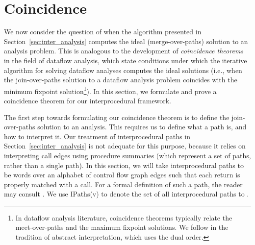    






































\section{Coincidence}

 We now consider the question of when the algorithm presented in
 Section~\ref{sec:inter_analysis} computes the ideal (merge-over-paths)
 solution to an analysis problem.  This is analogous to the development of
 \emph{coincidence theorems} \cite{Kam1977,Sharir1981,Knoop1992b,Lal2005} in
 the field of dataflow analysis, which state conditions under which the
 iterative algorithm for solving dataflow analyses computes the ideal
 solutions (i.e., when the join-over-paths solution to a dataflow analysis
 problem coincides with the minimum fixpoint solution\footnote{In dataflow
   analysis literature, coincidence theorems typically relate the
   meet-over-paths and the maximum fixpoint solutions.  We follow in the
   tradition of abstract interpretation, which uses the dual order.}).  In this
 section, we formulate and prove a coincidence theorem for our interprocedural
 framework.

 The first step towards formulating our coincidence theorem is to define the
 join-over-paths solution to an analysis.  This requires us to define what a
 path is, and how to interpret it.  Our treatment of interprocedural paths in
 Section~\ref{sec:inter_analysis} is not adequate for this purpose, because it
 relies on interpreting call edges using procedure summaries (which represent
 a set of paths, rather than a single path).  In this section, we will take
 interprocedural paths to be words over an alphabet of control flow graph
 edges such that each return is properly matched with a call.  For a formal
 definition of such a path, the reader may consult \cite{Sharir1981}.  We use
 \textsf{IPaths(v)} to denote the set of all interprocedural paths to .

